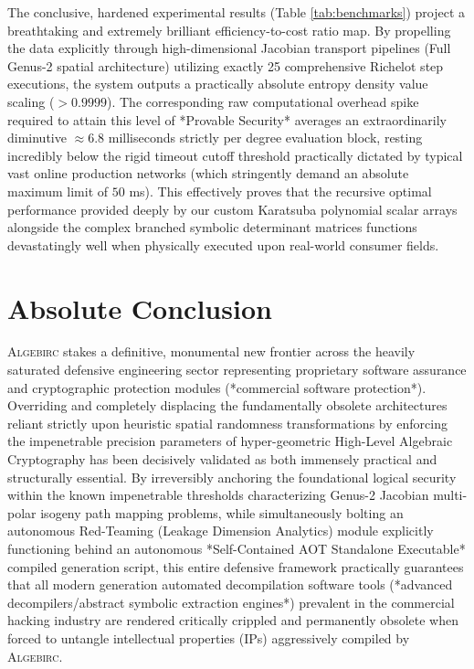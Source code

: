 The conclusive, hardened experimental results (Table \ref{tab:benchmarks}) project a breathtaking and extremely brilliant efficiency-to-cost ratio map. By propelling the data explicitly through high-dimensional Jacobian transport pipelines (Full Genus-2 spatial architecture) utilizing exactly 25 comprehensive Richelot step executions, the system outputs a practically absolute entropy density value scaling ($>0.9999$). The corresponding raw computational overhead spike required to attain this level of *Provable Security* averages an extraordinarily diminutive $\approx 6.8$ milliseconds strictly per degree evaluation block, resting incredibly below the rigid timeout cutoff threshold practically dictated by typical vast online production networks (which stringently demand an absolute maximum limit of $50$ ms). This effectively proves that the recursive optimal performance provided deeply by our custom Karatsuba polynomial scalar arrays alongside the complex branched symbolic determinant matrices functions devastatingly well when physically executed upon real-world consumer fields.

\section{Absolute Conclusion}
\textsc{Algebirc} stakes a definitive, monumental new frontier across the heavily saturated defensive engineering sector representing proprietary software assurance and cryptographic protection modules (*commercial software protection*). Overriding and completely displacing the fundamentally obsolete architectures reliant strictly upon heuristic spatial randomness transformations by enforcing the impenetrable precision parameters of hyper-geometric High-Level Algebraic Cryptography has been decisively validated as both immensely practical and structurally essential. By irreversibly anchoring the foundational logical security within the known impenetrable thresholds characterizing Genus-2 Jacobian multi-polar isogeny path mapping problems, while simultaneously bolting an autonomous Red-Teaming (Leakage Dimension Analytics) module explicitly functioning behind an autonomous *Self-Contained AOT Standalone Executable* compiled generation script, this entire defensive framework practically guarantees that all modern generation automated decompilation software tools (*advanced decompilers/abstract symbolic extraction engines*) prevalent in the commercial hacking industry are rendered critically crippled and permanently obsolete when forced to untangle intellectual properties (IPs) aggressively compiled by \textsc{Algebirc}.

